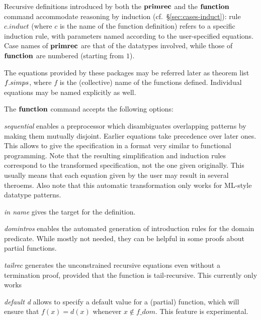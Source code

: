 Recursive definitions introduced by both the ${\mathord{\mathbf{primrec}}}$
and the ${\mathord{\mathbf{function}}}$ command accommodate reasoning by
induction (cf.\ \S\ref{sec:cases-induct}): rule $c\mathord{.}induct$
(where $c$ is the name of the function definition) refers to a
specific induction rule, with parameters named according to the
user-specified equations.  Case names of ${\mathord{\mathbf{primrec}}}$ are
that of the datatypes involved, while those of
${\mathord{\mathbf{function}}}$ are numbered (starting from $1$).

The equations provided by these packages may be referred later as theorem list
$f{\mathord.}simps$, where $f$ is the (collective) name of the functions defined.
Individual equations may be named explicitly as well.

The ${\mathord{\mathbf{function}}}$ command accepts the following options:

\begin{descr}
\item [\emph{sequential}] enables a preprocessor which disambiguates
  overlapping patterns by making them mutually disjoint. Earlier
  equations take precedence over later ones. This allows to give the
  specification in a format very similar to functional programming.
  Note that the resulting simplification and induction rules
  correspond to the transformed specification, not the one given
  originally. This usually means that each equation given by the user
  may result in several theroems.
  Also note that this automatic transformation only works
  for ML-style datatype patterns.


\item [\emph{in name}] gives the target for the definition.

\item [\emph{domintros}] enables the automated generation of
  introduction rules for the domain predicate. While mostly not
  needed, they can be helpful in some proofs about partial functions.

\item [\emph{tailrec}] generates the unconstrained recursive equations
  even without a termination proof, provided that the function is
  tail-recursive. This currently only works 

\item [\emph{default d}] allows to specify a default value for a
  (partial) function, which will ensure that $f(x)=d(x)$ whenever $x
  \notin \textit{f\_dom}$. This feature is experimental.
\end{descr}

